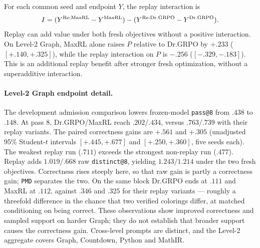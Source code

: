 \documentclass{article}
\newcommand{\1}{\mathbf 1}
\newcommand{\pmd}{\texttt{PMD}}
\theoremstyle{remark}
\theoremstyle{definition}
\theoremstyle{plain}
\begin{document}
For each common seed and endpoint $Y$, the replay interaction is
\[
 I=(Y^{\rm Re:MaxRL}-Y^{\rm MaxRL})
    -(Y^{\rm Re:Dr.GRPO}-Y^{\rm Dr.GRPO}).
\]
Replay can add value under both fresh objectives without a positive
interaction. On Level-2 Graph, MaxRL alone raises $P$ relative to Dr.GRPO
by $+.233$ ($[+.140,+.325]$), while the replay interaction on $P$ is
$-.256$ ($[-.329,-.183]$). This is an additional replay benefit after
stronger fresh optimization, without a superadditive interaction.

\begin{table}[H]
  \centering
  \caption{\textbf{Fresh-objective effects and replay interactions on Level 2.}
  All three contrasts within a domain use the same four-arm seed
  intersection. The interaction is
  $(\mathrm{Re:MaxRL}-\mathrm{MaxRL})-
  (\mathrm{Re:Dr.GRPO}-\mathrm{Dr.GRPO})$.
  Each entry gives its mean and, only for a complete five-seed block, a
  paired unadjusted 95\% Student-$t$ interval. Archived four-arm exports:
  \href{https://huggingface.co/od2961/maxent-grpo-models/blob/main/experiments/E119/README.md\#models}{E119 model index}.}
  \label{tab:level2-factorial-contrasts}
  \scriptsize
  \setlength{\tabcolsep}{3pt}
\end{table}


\paragraph{Level-2 Graph endpoint detail.}
\label{app:levels-numerical-detail}
The development admission comparison lowers frozen-model \texttt{pass@8} from $.438$
to $.148$. At pass 8, Dr.GRPO/MaxRL reach $.202/.434$, versus $.763/.739$
with their replay variants. The paired correctness gains are $+.561$ and
$+.305$ (unadjusted 95\% Student-$t$ intervals $[+.445,+.677]$ and
$[+.250,+.360]$, five seeds each). The weakest replay run ($.711$) exceeds
the strongest non-replay run ($.477$). Replay adds $1.019/.668$ raw
\texttt{distinct@8}, yielding $1.243/1.214$ under the two fresh objectives.
Correctness rises steeply here, so that raw gain is partly a correctness gain;
\pmd{} separates the two. On the same block Dr.GRPO ends at $.111$ and MaxRL at
$.112$, against $.346$ and $.325$ for their replay variants --- roughly a
threefold difference in the chance that two verified colorings differ, at
matched conditioning on being correct.
These observations show improved correctness and sampled support on harder
Graph; they do not establish that broader support causes the correctness
gain. Cross-level prompts are distinct, and the Level-2 aggregate
covers Graph, Countdown, Python and MathIR.
\end{document}

